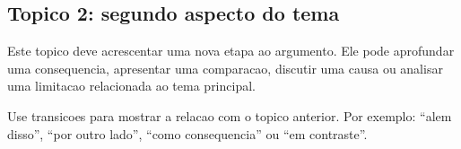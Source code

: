 \subsection{Topico 2: segundo aspecto do tema}


Este topico deve acrescentar uma nova etapa ao argumento. Ele pode aprofundar
uma consequencia, apresentar uma comparacao, discutir uma causa ou analisar uma
limitacao relacionada ao tema principal.

Use transicoes para mostrar a relacao com o topico anterior. Por exemplo:
``alem disso'', ``por outro lado'', ``como consequencia'' ou ``em contraste''.
